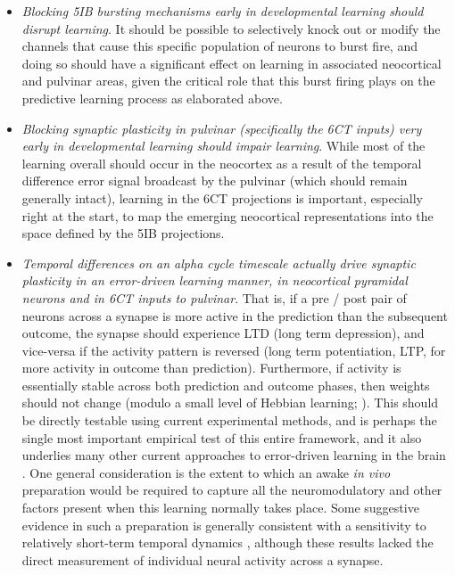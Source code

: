 \documentclass[11pt,twoside]{article}
\newif\myifpdf
\begin{document}
\begin{itemize}
	\item \emph{Blocking 5IB bursting mechanisms early in developmental learning should disrupt learning}.  It should be possible to selectively knock out or modify the channels that cause this specific population of neurons to burst fire, and doing so should have a significant effect on learning in associated neocortical and pulvinar areas, given the critical role that this burst firing plays on the predictive learning process as elaborated above.

	\item \emph{Blocking synaptic plasticity in pulvinar (specifically the 6CT inputs) very early in developmental learning should impair learning}.  While most of the learning overall should occur in the neocortex as a result of the temporal difference error signal broadcast by the pulvinar (which should remain generally intact), learning in the 6CT projections is important, especially right at the start, to map the emerging neocortical representations into the space defined by the 5IB projections.
	
	\item \emph{Temporal differences on an alpha cycle timescale actually drive synaptic plasticity in an error-driven learning manner, in neocortical pyramidal neurons and in 6CT inputs to pulvinar}.  That is, if a pre / post pair of neurons across a synapse is more active in the prediction than the subsequent outcome, the synapse should experience LTD (long term depression), and vice-versa if the activity pattern is reversed (long term potentiation, LTP, for more activity in outcome than prediction).  Furthermore, if activity is essentially stable across both prediction and outcome phases, then weights should not change (modulo a small level of Hebbian learning; \citealp{OReillyMunakata00,OReillyMunakataFrankEtAl12}).  This should be directly testable using current  experimental methods, and is perhaps the single most important empirical test of this entire framework, and it also underlies many other current approaches to error-driven learning in the brain \citep{BengioMesnardFischerEtAl17,WhittingtonBogacz19,LillicrapSantoroMarrisEtAl20}.  One general consideration is the extent to which an awake \emph{in vivo} preparation would be required to capture all the neuromodulatory and other factors present when this learning normally takes place.  Some suggestive evidence in such a preparation is generally consistent with a sensitivity to relatively short-term temporal dynamics \citep{LimMcKeeWoloszynEtAl15}, although these results lacked the direct measurement of individual neural activity across a synapse.

\end{itemize}
\end{document}
